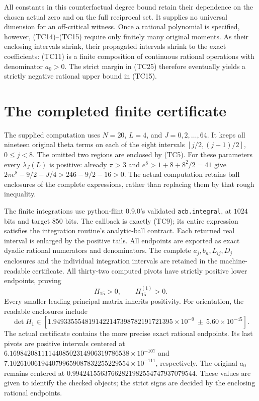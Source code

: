 All constants in this counterfactual degree bound retain their
dependence on the chosen actual zero and on the full reciprocal
set. It supplies no universal dimension for an off-critical
witness. Once a rational polynomial is specified, however,
(TC14)--(TC15) require only finitely many original moments.
As their enclosing intervals shrink, their propagated intervals
shrink to the exact coefficients: (TC11) is a finite composition
of continuous rational operations with denominator $a_0>0$.
The strict margin in (TC25) therefore eventually yields a strictly
negative rational upper bound in (TC15).

\section{The completed finite certificate}
The supplied computation uses $N=20$, $L=4$, and $J=0,2,\ldots,64$.
It keeps all nineteen original theta terms on each of the eight
intervals $[j/2,(j+1)/2]$, $0\le j<8$. The omitted two regions
are enclosed by (TC5). For these parameters every
$\lambda_J(L)$ is positive: already $\pi>3$ and
$e^8>1+8+8^2/2=41$ give
$2\pi e^8-9/2-J/4>246-9/2-16>0$.
The actual computation retains ball enclosures of the complete
expressions, rather than replacing them by that rough inequality.

The finite integrations use python-flint 0.9.0's validated
\texttt{acb.integral}, at $1024$ bits and target $850$ bits.
The callback is exactly (TC9); its entire expression satisfies
the integration routine's analytic-ball contract. Each returned
real interval is enlarged by the positive tails. All endpoints
are exported as exact dyadic rational numerators and denominators.
The complete $a_j,b_n,L_{ij},D_j$ enclosures and the individual
integration intervals are retained in the machine-readable
certificate. All thirty-two computed pivots have strictly
positive lower endpoints, proving
\[
H_{15}>0,\qquad H_{15}^{(1)}>0.
\tag{TC27}
\]
Every smaller leading principal matrix inherits positivity.
For orientation, the readable enclosures include
\[
\det H_1\in
\left[1.9493355548191422147398782191721395\times10^{-9}
\ \mathbin{\pm}\ 5.60\times10^{-45}\right].
\tag{TC28}
\]
The actual certificate contains the more precise exact rational
endpoints. Its last pivots are positive intervals centered at
$6.1698420811114408502314906319786538\times10^{-107}$
and
$7.1026100619440799659087832255229554\times10^{-111}$,
respectively. The original $a_0$ remains centered at
$0.99424155637662821982554747937079544$.
These values are given to identify the checked objects; the
strict signs are decided by the enclosing rational endpoints.

